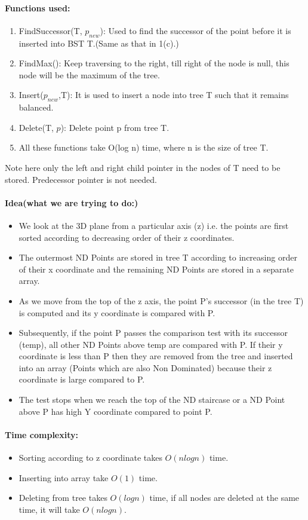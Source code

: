 \documentclass[pdftex,a4paper,12pt]{report}
\begin{document}
\paragraph{Functions used:}
\begin{enumerate}
 \item 
 FindSuccessor(T, $p_{new}$): Used to find the successor of the point before it is inserted into BST T.(Same as that in 1(c).)
\item
FindMax(): Keep traversing to the right, till right of the node is null, this node will be the maximum of the tree.
 \item
 Insert($p_{new}$,T): It is used to insert a node into tree T such that it remains balanced.
 \item
 Delete(T, $p$): Delete point p from tree T.
 \item
 All these functions take O(log n) time, where n is the size of tree T. 
\end{enumerate}
Note here only the left and right child pointer in the nodes of T need to be stored. Predecessor pointer
is not needed.
\paragraph{Idea(what we are trying to do:)}
\begin{itemize}
 \item 
We look at the 3D plane from a particular axis (z) i.e. the points are first sorted according to decreasing order of their z coordinates.
\item
The outermost ND Points are stored in tree T according to increasing order of their x coordinate and the remaining ND Points are stored in a separate array.
\item
As we move from the top of the z axis, the point P’s successor (in the tree T) is computed and its y coordinate is compared with P.
\item
Subsequently, if the point P passes the comparison test with its successor (temp), all other ND Points above temp are compared with P. If their y coordinate is less than P then they
are removed from the tree and inserted into an array (Points which are also Non Dominated) because their z coordinate is large compared to P.
\item
The test stops when we reach the top of the ND staircase or a ND Point above P has high Y coordinate compared to point P.
\end{itemize}

\paragraph{Time complexity:}
\begin{itemize}
 \item 
Sorting according to z coordinate takes $O(n log n)$ time.
\item
Inserting into array take $O(1)$ time.
\item
Deleting from tree takes $O(log n)$ time, if all nodes are deleted at the same time, it will take $O(n logn)$.
\end{itemize}
\end{document}
